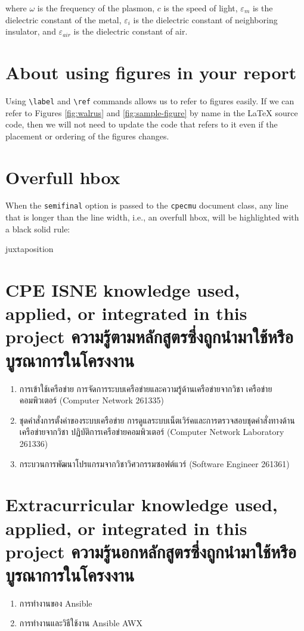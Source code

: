 \noindent
where $\omega$ is the frequency of the plasmon, $c$ is the speed of
light, $\varepsilon_m$ is the dielectric constant of the metal,
$\varepsilon_i$ is the dielectric constant of neighboring insulator,
and $\varepsilon_\mathit{air}$ is the dielectric constant of air.

\section{About using figures in your report}

Using \verb.\label. and \verb.\ref. commands allows us to refer to
figures easily. If we can refer to Figures
\ref{fig:walrus} and \ref{fig:sample-figure} by name in the {\LaTeX}
source code, then we will not need to update the code that refers to it
even if the placement or ordering of the figures changes.


\section{Overfull hbox}

When the \verb.semifinal. option is passed to the \verb.cpecmu. document class,
any line that is longer than the line width, i.e., an overfull hbox, will be
highlighted with a black solid rule:
\begin{center}
\begin{minipage}{2em}
juxtaposition
\end{minipage}
\end{center}

\section{\ifenglish%
\ifcpe CPE \else ISNE \fi knowledge used, applied, or integrated in this project
\else%
ความรู้ตามหลักสูตรซึ่งถูกนำมาใช้หรือบูรณาการในโครงงาน
\fi
}
\begin{enumerate}
\item การเข้าใช้เครือข่าย การจัดการระบบเครือข่ายและความรู้ด้านเครือข่ายจากวิชา เครือข่ายคอมพิวเตอร์ (Computer Network 261335) 
\item ชุดคำสั่งการตั้งค่าของระบบเครือข่าย การดูแลระบบเน็ตเวิร์คและการตรวจสอบชุดคำสั่งทางด้านเครือข่ายจากวิชา ปฏิบัติการเครือข่ายคอมพิวเตอร์ (Computer Network Laboratory 261336)
\item กระบวนการพัฒนาโปรแกรมจากวิชาวิศวกรรมซอฟต์แวร์ (Software Engineer 261361)
\end{enumerate}

\section{\ifenglish%
Extracurricular knowledge used, applied, or integrated in this project
\else%
ความรู้นอกหลักสูตรซึ่งถูกนำมาใช้หรือบูรณาการในโครงงาน
\fi
}

\begin{enumerate}
  \item การทำงานของ Ansible
  \item การทำงานและวิธีใช้งาน Ansible AWX
\end{enumerate}
